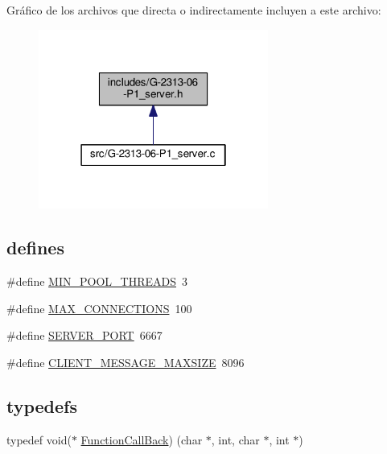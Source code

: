 Gráfico de los archivos que directa o indirectamente incluyen a este archivo\+:\nopagebreak
\begin{figure}[H]
\begin{center}
\leavevmode
\includegraphics[width=214pt]{G-2313-06-P1__server_8h__dep__incl}
\end{center}
\end{figure}
\subsection*{\textquotesingle{}defines\textquotesingle{}}
\begin{DoxyCompactItemize}
\item 
\#define \hyperlink{G-2313-06-P1__server_8h_a80c7be19e867e55f90be3fa66cf65300}{M\+I\+N\+\_\+\+P\+O\+O\+L\+\_\+\+T\+H\+R\+E\+A\+D\+S}~3
\item 
\#define \hyperlink{G-2313-06-P1__server_8h_a053b7859476cc9867ec62c49e68d3fa1}{M\+A\+X\+\_\+\+C\+O\+N\+N\+E\+C\+T\+I\+O\+N\+S}~100
\item 
\#define \hyperlink{G-2313-06-P1__server_8h_ac42367fe5c999ec6650de83e9d72fe8c}{S\+E\+R\+V\+E\+R\+\_\+\+P\+O\+R\+T}~6667
\item 
\#define \hyperlink{G-2313-06-P1__server_8h_a97ed8e840fc4086fc86554e6d1277ca8}{C\+L\+I\+E\+N\+T\+\_\+\+M\+E\+S\+S\+A\+G\+E\+\_\+\+M\+A\+X\+S\+I\+Z\+E}~8096
\end{DoxyCompactItemize}
\subsection*{\textquotesingle{}typedefs\textquotesingle{}}
\begin{DoxyCompactItemize}
\item 
typedef void($\ast$ \hyperlink{G-2313-06-P1__server_8h_ae102cd0a63430b827183f70ce476a887}{Function\+Call\+Back}) (char $\ast$, int, char $\ast$, int $\ast$)
\end{DoxyCompactItemize}
